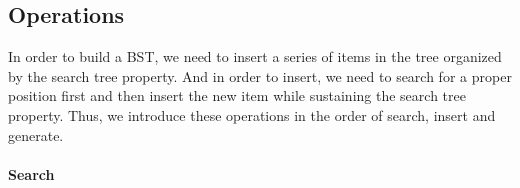 \documentclass[main.tex]{subfiles}
\begin{document}
\subsection{Operations}


In order to build a BST, we need to insert a series of items in the tree organized by the search tree property. And in order to insert, we need to search for a proper position first and then insert the new item while sustaining the search tree property. Thus, we introduce these operations in the order of search, insert and generate. 

\paragraph{Search}
\end{document}

